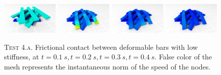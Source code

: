 \documentclass[final,3p]{elsarticle}
\begin{document}
\begin{figure}[!tbp]
  \centering
	\includegraphics[width=0.24\textwidth]{pics/ribbons_3_20.png}
  \includegraphics[width=0.24\textwidth]{pics/ribbons_3_40.png}
	\includegraphics[width=0.24\textwidth]{pics/ribbons_3_60.png}
	\includegraphics[width=0.24\textwidth]{pics/ribbons_3_80.png}
	\hfill
  \caption{\textsc{Test 4.a}. Frictional contact between deformable bars with low stiffness, at $t=\SI{0.1}{s},t=\SI{0.2}{s},t=\SI{0.3}{s},t=\SI{0.4}{s}$. False color of the mesh represents the instantaneous norm of the speed of the nodes.}
	\label{fig:ribbons_1}
\end{figure}

\end{document}
